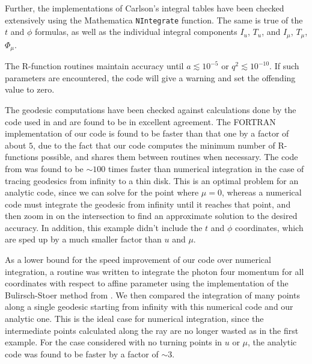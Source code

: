 \documentclass[apj]{emulateapj}
\begin{document}
Further, the implementations of Carlson's integral tables have been checked extensively using the Mathematica \texttt{NIntegrate} function. The same is true of the $t$ and $\phi$ formulas, as well as the individual integral components $I_u$, $T_u$, and $I_\mu$, $T_\mu$, $\Phi_\mu$. 

The R-function routines maintain accuracy until $a \lesssim 10^{-5}$ or $q^2 \lesssim 10^{-10}$. If such parameters are encountered, the code will give a warning and set the offending value to zero.

The geodesic computations have been checked against calculations done by the code used in \citet{falcke} and are found to be in excellent agreement. The FORTRAN implementation of our code is found to be faster than that one by a factor of about $5$, due to the fact that our code computes the minimum number of R-functions possible, and shares them between routines when necessary. The code from \citet{agolphd} was found to be $\sim 100$ times faster than numerical integration in the case of tracing geodesics from infinity to a thin disk. This is an optimal problem for an analytic code, since we can solve for the point where $\mu=0$, whereas a numerical code must integrate the geodesic from infinity until it reaches that point, and then zoom in on the intersection to find an approximate solution to the desired accuracy. In addition, this example didn't include the $t$ and $\phi$ coordinates, which are sped up by a much smaller factor than $u$ and $\mu$.

As a lower bound for the speed improvement of our code over numerical integration, a routine was written to integrate the photon four momentum for all coordinates with respect to affine parameter using the implementation of the Bulirsch-Stoer method from \citet{numrecipes}. We then compared the integration of many points along a single geodesic starting from infinity with this numerical code and our analytic one. This is the ideal case for numerical integration, since the intermediate points calculated along the ray are no longer wasted as in the first example. For the case considered with no turning points in $u$ or $\mu$, the analytic code was found to be faster by a factor of $\sim 3$. 
\end{document}

